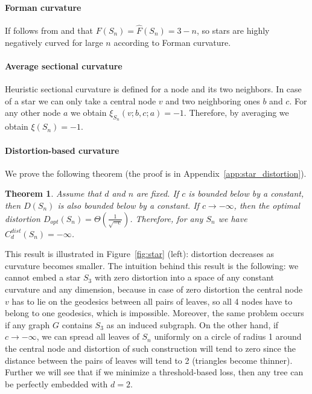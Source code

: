 \documentclass{article} %
\newtheorem{theorem}{Theorem}[section]
\begin{document}
\paragraph{Forman curvature}
If follows from  and  that
$F(S_n) = \hat F(S_n) = 3-n$, so stars are highly negatively curved for large $n$ according to Forman curvature.

\paragraph{Average sectional curvature}

Heuristic sectional curvature is defined for a node and its two neighbors. In case of a star we can only take a central node $v$ and two neighboring ones $b$ and $c$. For any other node $a$ we obtain $\xi_{S_n}(v;b,c;a) = -1$. Therefore, by averaging we obtain $\xi(S_n) = -1$.

\paragraph{Distortion-based curvature} 
We prove the following theorem (the proof is in Appendix~\ref{app:star_distortion}).

\begin{theorem}\label{thm:star_distortion}
Assume that $d$ and $n$ are fixed.
If $c$ is bounded below by a constant, then $D(S_n)$ is also bounded below by a constant. 
If $c \to -\infty$, then the optimal distortion $D_{opt}(S_n) = \Theta\left(\frac{1}{\sqrt{-c}}\right)$.
Therefore, for any $S_n$ we have $C_d^{dist}(S_n) = -\infty$.
\end{theorem}

This result is illustrated in Figure~\ref{fig:star} (left): distortion decreases as curvature becomes smaller.
The intuition behind this result is the following: we cannot embed a star $S_3$ with zero distortion into a space of any constant curvature and any dimension, because in case of zero distortion the central node $v$ has to lie on the geodesics between all pairs of leaves, so all 4 nodes have to belong to one geodesics, which is impossible. Moreover, the same problem occurs if any graph $G$ contains $S_3$ as an induced subgraph.
On the other hand, if $c \to -\infty$, we can spread all leaves of $S_n$ uniformly on a circle of radius 1 around the central node and distortion of such construction will tend to zero since the distance between the pairs of leaves will tend to 2 (triangles become thinner). 
Further we will see that if we minimize a threshold-based loss, then any tree can be perfectly embedded with $d = 2$.
\end{document}
